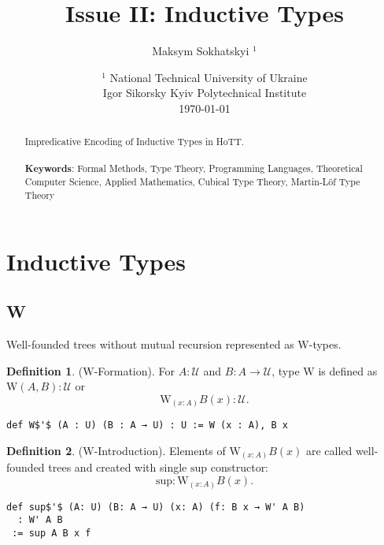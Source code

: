 \documentclass{article}
\theoremstyle{definition}
\newtheorem{definition}{Definition}
\begin{document}
\title{Issue II: Inductive Types}
\author{Maksym Sokhatskyi $^1$}
\date{ $^1$ National Technical University of Ukraine \\
       \small Igor Sikorsky Kyiv Polytechnical Institute \\
       \today }

\maketitle

\begin{abstract}

Impredicative Encoding of Inductive Types in HoTT.
\\
\\
{\bf Keywords}: Formal Methods, Type Theory, Programming Languages,
          Theoretical Computer Science, Applied Mathematics,
          Cubical Type Theory, Martin-Löf Type Theory
\end{abstract}

\ifincludeTOC
  \tableofcontents
\fi

\newpage
\section{Inductive Types}

\subsection{W}

Well-founded trees without mutual recursion represented as $\mathrm{W}$-types.

\begin{definition} ($\mathrm{W}$-Formation).
For $A : \mathcal{U}$ and $B : A \rightarrow \mathcal{U}$, type $\mathrm{W}$
is defined as $\mathrm{W}(A,B) : \mathcal{U}$ or
$$
   \mathrm{W}_{(x : A)} B(x) : \mathcal{U}.
$$
\begin{lstlisting}[mathescape=true]
def W$'$ (A : U) (B : A → U) : U := W (x : A), B x
\end{lstlisting}
\end{definition}

\begin{definition} ($\mathrm{W}$-Introduction).
Elements of $\mathrm{W}_{(x : A)} B(x)$ are called
well-founded trees and created with single $\mathrm{sup}$ constructor:
$$
  \mathrm{sup} : \mathrm{W}_{(x: A)} B(x).
$$
\begin{lstlisting}
def sup$'$ (A: U) (B: A → U) (x: A) (f: B x → W' A B)
  : W' A B
 := sup A B x f
\end{lstlisting}
\end{definition}
\end{document}
